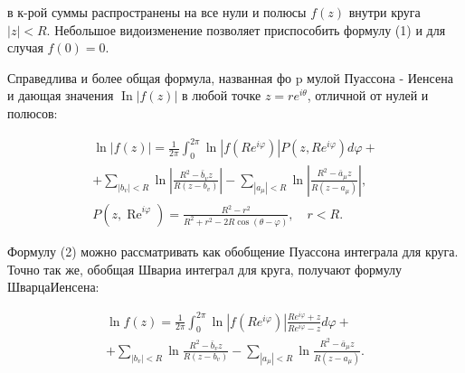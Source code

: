 \documentclass[10pt]{article}
\begin{document}
в к-рой суммы распространены на все нули и полюсы $f(z)$ внутри круга $|z|<R$. Небольшое видоизменение позволяет приспособить формулу (1) и для случая $f(0)=0$.



Справедлива и более общая формула, названная фо p мулой Пуассона - Иенсена и дающая значения $\operatorname{In}|f(z)|$ в любой точке $z=r e^{i \theta}$, отличной от нулей и полюсов:



\[

\begin{gathered}

\ln |f(z)|=\frac{1}{2 \pi} \int_{0}^{2 \pi} \ln \left|f\left(R e^{i \varphi}\right)\right| P\left(z, R e^{i \varphi}\right) d \varphi+ \\

+\sum_{\left|b_{v}\right|<R} \ln \left|\frac{R^{2}-\bar{b}_{v} z}{R\left(z-b_{v}\right)}\right|-\sum_{\left|a_{\mu}\right|<R} \ln \left|\frac{R^{2}-\bar{a}_{\mu} z}{R\left(z-a_{\mu}\right)}\right|, \\

P\left(z, \operatorname{Re}^{i \varphi}\right)=\frac{R^{2}-r^{2}}{R^{2}+r^{2}-2 R \cos (\theta-\varphi)}, \quad r<R .

\end{gathered}

\]



Формулу (2) можно рассматривать как обобщение Пуассона интеграла для круга. Точно так же, обобщая Швариа интеграл для круга, получают формулу ШварцаИенсена:



\[

\begin{gathered}

\ln f(z)=\frac{1}{2 \pi} \int_{0}^{2 \pi} \ln \left|f\left(R e^{i \varphi}\right)\right| \frac{R e^{i \varphi}+z}{R e^{i \varphi}-z} d \varphi+ \\

+\sum_{\left|b_{v}\right|<R} \ln \frac{R^{2}-\bar{b}_{v} z}{R\left(z-b_{v}\right)}-\sum_{\left|a_{\mu}\right|<R} \ln \frac{R^{2}-\bar{a}_{\mu} z}{R\left(z-a_{\mu}\right)} .

\end{gathered}

\]
\end{document}
